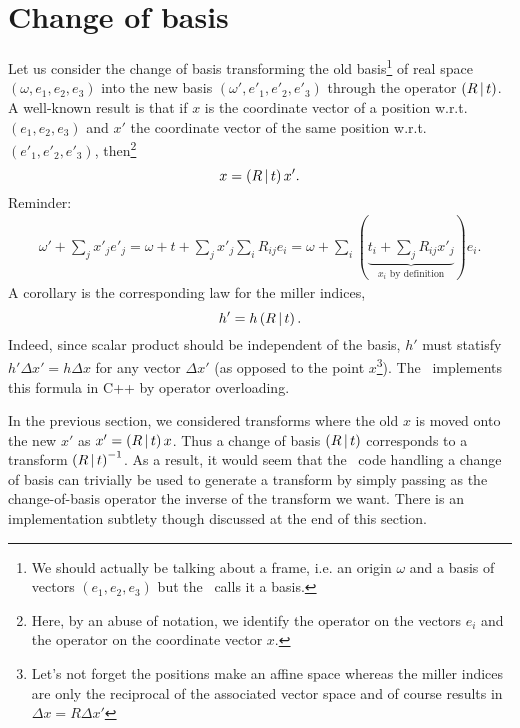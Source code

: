 \documentclass[11pt]{article}
\begin{document}
\section{Change of basis}

Let us consider the change of basis transforming the old basis\footnote{We should actually be talking about a frame, i.e. an origin $\omega$ and a basis of vectors $(e_1, e_2, e_3)$ but the \cctbx\ calls it a basis.} of real space $(\omega, e_1, e_2, e_3)$ into the new basis $(\omega', e'_1, e'_2, e'_3)$ through the operator $\left( R\,\vert\, t \right)$. A well-known result is that if $x$ is the coordinate vector of a position w.r.t. $(e_1, e_2, e_3)$ and $x'$ the coordinate vector of the same position w.r.t. $(e'_1, e'_2, e'_3)$, then\footnote{Here, by an abuse of notation, we identify the operator on the vectors $e_i$ and the operator on the coordinate vector $x$.}
\begin{equation}
x = \left( R\,\vert\, t \right)x'.
\label{change::of::basis::position}
\end{equation}
Reminder:
\begin{align}
\omega' + \sum_j x'_j e'_j = \omega + t + \sum_j x'_j \sum_i R_{ij} e_i = \omega + \sum_i (\underbrace{t_i + \sum_j R_{ij} x'_j}_{x_i \text{ by definition}})e_i. \nonumber
\end{align}
A corollary is the corresponding law for the miller indices,
\begin{equation}
h' = h\left( R\,\vert\, t \right).
\end{equation}
Indeed, since scalar product should be independent of the basis, $h'$ must statisfy $h'\Delta x' = h\Delta x$ for any vector $\Delta x'$ (as opposed to the point $x$\footnote{Let's not forget the positions make an affine space whereas the miller indices are only the reciprocal of the associated vector space and of course  results in $\Delta x = R \Delta x'$}). The \cctbx\ implements this formula in C++ by operator overloading.

In the previous section, we considered transforms where the old $x$ is moved onto the new $x'$ as $x' = \left( R\,\vert\, t \right) x$. Thus a change of basis $\left( R\,\vert\, t \right)$ corresponds to a transform $\left( R\,\vert\, t \right)^{-1}$. As a result, it would seem that the \cctbx\ code handling a change of basis can trivially be used to generate a transform by simply passing as the change-of-basis operator the inverse of the transform we want. There is an implementation subtlety though discussed at the end of this section.
\end{document}
